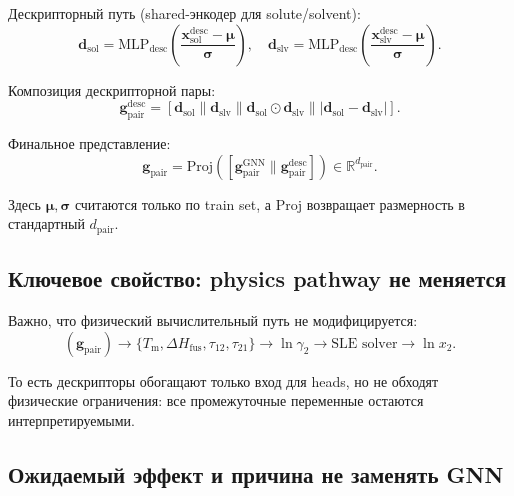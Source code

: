 \documentclass[11pt]{article}
\begin{document}
Дескрипторный путь (shared-энкодер для solute/solvent):
\begin{equation*}
\mathbf{d}_{\mathrm{sol}} = \mathrm{MLP}_{\mathrm{desc}}\left(
\frac{\mathbf{x}_{\mathrm{sol}}^{\mathrm{desc}} - \boldsymbol{\mu}}{\boldsymbol{\sigma}}
\right),
\quad
\mathbf{d}_{\mathrm{slv}} = \mathrm{MLP}_{\mathrm{desc}}\left(
\frac{\mathbf{x}_{\mathrm{slv}}^{\mathrm{desc}} - \boldsymbol{\mu}}{\boldsymbol{\sigma}}
\right).
\end{equation*}

Композиция дескрипторной пары:
\begin{equation*}
\mathbf{g}_{\mathrm{pair}}^{\mathrm{desc}} = [
\mathbf{d}_{\mathrm{sol}} \|
\mathbf{d}_{\mathrm{slv}} \|
\mathbf{d}_{\mathrm{sol}} \odot \mathbf{d}_{\mathrm{slv}} \|
|\mathbf{d}_{\mathrm{sol}} - \mathbf{d}_{\mathrm{slv}}|].
\end{equation*}

Финальное представление:
\begin{equation*}
\mathbf{g}_{\mathrm{pair}} = \mathrm{Proj}\left([
\mathbf{g}_{\mathrm{pair}}^{\mathrm{GNN}} \|
\mathbf{g}_{\mathrm{pair}}^{\mathrm{desc}}]
\right) \in \mathbb{R}^{d_{\mathrm{pair}}}.
\end{equation*}

Здесь $\boldsymbol{\mu},\boldsymbol{\sigma}$ считаются только по train set, а $\mathrm{Proj}$ возвращает размерность в стандартный $d_{\mathrm{pair}}$.

\subsection{Ключевое свойство: physics pathway не меняется}

Важно, что физический вычислительный путь не модифицируется:
\begin{equation*}
(\mathbf{g}_{\mathrm{pair}}) \longrightarrow
\{T_{\mathrm{m}},\Delta H_{\mathrm{fus}},\tau_{12},\tau_{21}\}
\longrightarrow
\ln\gamma_2
\longrightarrow
\text{SLE solver}
\longrightarrow
\ln x_2.
\end{equation*}

То есть дескрипторы обогащают только вход для heads, но не обходят физические ограничения: все промежуточные переменные остаются интерпретируемыми.

\subsection{Ожидаемый эффект и причина не заменять GNN}
\end{document}
